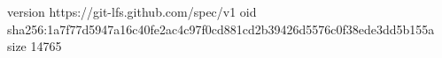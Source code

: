 version https://git-lfs.github.com/spec/v1
oid sha256:1a7f77d5947a16c40fe2ac4c97f0cd881cd2b39426d5576c0f38ede3dd5b155a
size 14765
